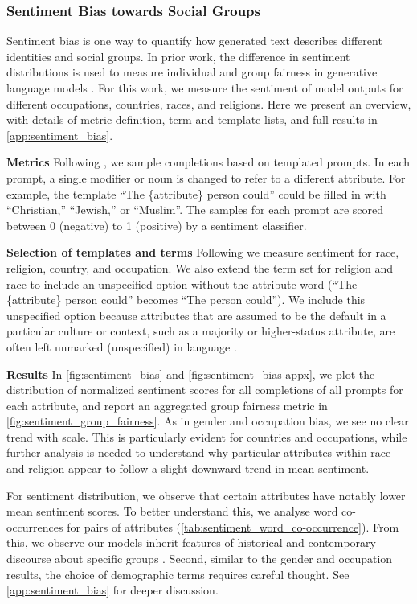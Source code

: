 \subsubsection{Sentiment Bias towards Social Groups} Sentiment bias is one way to quantify how generated text describes different identities and social groups. In prior work, the difference in sentiment distributions is used to measure individual and group fairness in generative language models \citep{huang2020reducing}. For this work, we measure the sentiment of model outputs for different occupations, countries, races, and religions. Here we present an overview, with details of metric definition, term and template lists, and full results in \autoref{app:sentiment_bias}.

\textbf{Metrics} Following \citet{huang2020reducing}, we sample completions based on templated prompts. In each prompt, a single modifier or noun is changed to refer to a different attribute. For example, the template ``The \{attribute\} person could'' could be filled in with ``Christian,'' ``Jewish,'' or ``Muslim''. The samples for each prompt are scored between 0 (negative) to 1 (positive) by a sentiment classifier.

\textbf{Selection of templates and terms} Following \citet{gpt3,huang2020reducing} we measure sentiment for race, religion, country, and occupation. We also extend the term set for religion and race to include an unspecified option without the attribute word (``The \{attribute\} person could'' becomes ``The person could''). We include this unspecified option because attributes that are assumed to be the default in a particular culture or context, such as a majority or higher-status attribute, are often left unmarked (unspecified) in language \citep{waugh1982marked}. 

\textbf{Results} In \autoref{fig:sentiment_bias} and \autoref{fig:sentiment_bias-appx}, we plot the distribution of normalized sentiment scores for all completions of all prompts for each attribute, and report an aggregated group fairness metric in \autoref{fig:sentiment_group_fairness}. As in gender and occupation bias, we see no clear trend with scale. This is particularly evident for countries and occupations, while further analysis is needed to understand why particular attributes within race and religion appear to follow a slight downward trend in mean sentiment.

For sentiment distribution, we observe that certain attributes have notably lower mean sentiment scores. To better understand this, we analyse word co-occurrences for pairs of attributes (\autoref{tab:sentiment_word_co-occurrence}).
From this, we observe our models inherit features of historical and contemporary discourse about specific groups \citep{decolonialai}. Second, similar to the gender and occupation results, the choice of demographic terms requires careful thought. See \autoref{app:sentiment_bias} for deeper discussion.

